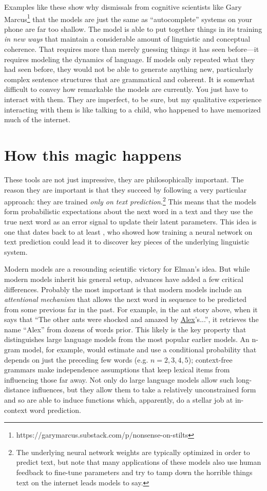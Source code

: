 \documentclass[output=paper,colorlinks,citecolor=brown
]{langscibook}
\begin{document}
Examples like these show why dismissals from cognitive scientists like Gary Marcus\footnote{ https://garymarcus.substack.com/p/nonsense-on-stilts} that the models are just the same as ``autocomplete'' systems on your phone are far too shallow. The model is able to put together things in its training \emph{in new ways} that maintain a considerable amount of linguistic and conceptual coherence. That requires more than merely guessing things it has seen before---it requires modeling the dynamics of language. If models only repeated what they had seen before, they would not be able to generate anything new, particularly complex sentence structures that are grammatical and coherent. It is somewhat difficult to convey how remarkable the models are currently. You just have to interact with them. They are imperfect, to be sure, but my qualitative experience interacting with them is like talking to a child, who happened to have memorized much of the internet. 

\section*{How this magic happens}

These tools are not just impressive, they are philosophically important. The reason they are important is that they succeed by following a very particular approach: they are trained \emph{only on text prediction}.\footnote{The underlying neural network weights are typically optimized in order to predict text, but note that many applications of these models also use human feedback to fine-tune parameters and try to tamp down the horrible things text on the internet leads models to say.} This means that the models form probabilistic expectations about the next word in a text and they use the true next word as an error signal to update their latent parameters. This idea is one that dates back to at least \cite{elman1990finding}, who showed how training a neural network on text prediction could lead it to discover key pieces of the underlying linguistic system. 

Modern models are a resounding scientific victory for Elman's idea. But while modern models inherit his general setup, advances have added a few critical differences. Probably the most important is that modern models include an \emph{attentional mechanism} that allows the next word in sequence to be predicted from some previous far in the past. For example, in the ant story above,  when it says that ``The other ants were shocked and amazed by \underline{Alex}'s...'', it retrieves the name ``Alex'' from dozens of words prior. This likely is the key property that distinguishes large language models from the most popular earlier  models. An n-gram model, for example, would estimate and use a conditional probability that depends on just the preceding few words (e.g. $n=2,3,4,5$); context-free grammars make independence assumptions that keep lexical items from influencing those far away. Not only do large language models allow such long-distance influences, but they allow them to take a relatively unconstrained form and so are able to induce functions which, apparently, do a stellar job at in-context word prediction. 
\end{document}
